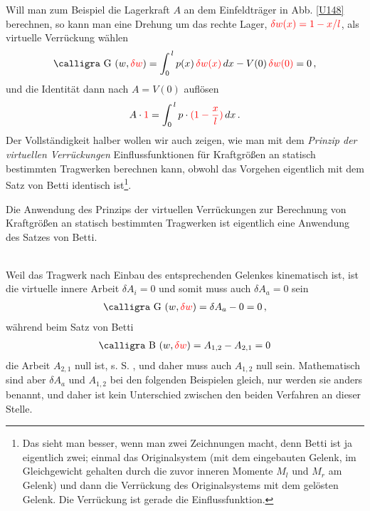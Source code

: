 {{{{Will man zum Beispiel die Lagerkraft $A$ an dem Einfeldtr\"{a}ger in Abb. \ref{U148} berechnen, so kann man eine Drehung um das rechte Lager, $\textcolor{red}{\delta w(x) = 1 - x/l}$, als virtuelle Verr\"{u}ckung w\"{a}hlen
\begin{align}
\text{\normalfont\calligra G\,\,}(w, \textcolor{red}{\delta w}) = \int_0^{\,l} p(x)\,\textcolor{red}{\delta w(x)}\,dx - V(0) \,\textcolor{red}{\delta w(0)} = 0\,,
\end{align}
und die Identit\"{a}t dann nach $A = V(0)$ aufl\"{o}sen
\begin{align}
A\cdot \textcolor{red}{1} = \int_0^{\,l} p\cdot\textcolor{red}{(1 - \frac{x}{l})}\,dx\,.
\end{align}
Der Vollst\"{a}ndigkeit halber wollen wir auch zeigen, wie man mit dem {\em Prinzip der virtuellen Verr\"{u}ckungen\/} Einflussfunktionen f\"{u}r Kraftgr\"{o}{\ss}en an statisch bestimmten Tragwerken berechnen kann, obwohl das Vorgehen eigentlich mit dem Satz von Betti identisch ist\footnote{Das sieht man besser, wenn man zwei Zeichnungen macht, denn Betti ist ja eigentlich \glq zwei\grq{}; einmal das Originalsystem (mit dem eingebauten Gelenk, im Gleichgewicht gehalten durch die zuvor inneren Momente $M_l$ und $M_r$ am Gelenk) und dann die Verr\"{u}ckung des Originalsystems mit dem gel\"{o}sten Gelenk. Die Verr\"{u}ckung ist gerade die Einflussfunktion. }.\\

\hspace*{-12pt}\colorbox{highlightBlue}{\parbox{0.98\textwidth}{Die Anwendung des Prinzips der virtuellen Verr\"{u}ckungen zur Berechnung von Kraftgr\"{o}{\ss}en an statisch bestimmten Tragwerken ist eigentlich eine Anwendung des Satzes von Betti.}}\\

Weil das Tragwerk nach Einbau des entsprechenden Gelenkes kinematisch ist, ist die virtuelle innere Arbeit $\delta A_i = 0$ und somit muss auch $\delta A_a = 0$ sein
\begin{align}
\text{\normalfont\calligra G\,\,}(w,\textcolor{red}{\delta w}) = \delta A_a - 0 = 0\,,
\end{align}
w\"{a}hrend beim Satz von Betti
\begin{align}
\text{\normalfont\calligra B\,\,}(w,\textcolor{red}{\delta w}) =  A_{1,2} - A_{2,1} = 0
\end{align}
die Arbeit $A_{2,1}$ null ist, s. S. \pageref{ImmerSo}, und daher muss auch $A_{1,2}$ null sein. Mathematisch sind aber $\delta A_a$ und $A_{1,2}$ bei den folgenden Beispielen gleich, nur werden sie anders benannt, und daher ist kein Unterschied zwischen den beiden Verfahren an dieser Stelle.

}}}}
